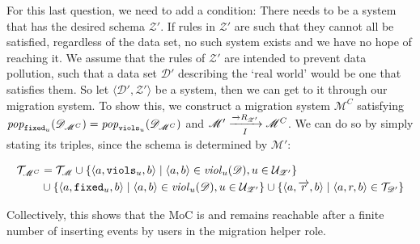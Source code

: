 \documentclass[runningheads]{llncs}
\newcommand{\id}[1]{\text{\it #1\/}}
\newcommand{\popF}[1]{\id{pop}_{#1}}
\newcommand{\pop}[2]{\popF{#1}(#2)}
\newcommand{\viol}[2]{\violC{#1}(#2)}
\newcommand{\violC}[1]{\id{viol}_{#1}}
\newcommand{\pair}[2]{\langle{#1},{#2}\rangle}
\newcommand{\triple}[3]{\langle{#1},{#2},{#3}\rangle}
\newcommand{\rels}{\mathcal{R}}   %
\newcommand{\triples}{\mathcal{T}}
\newcommand{\rules}{\mathcal{U}}
\newcommand{\dataset}{\mathscr{D}}
\newcommand{\schema}{\mathscr{Z}}
\newcommand{\migrsys}{\mathscr{M}}
\begin{document}
   For this last question, we need to add a condition:
   There needs to be a system that has the desired schema $\schema'$.
   If rules in $\schema'$ are such that they cannot all be satisfied, regardless of the data set, no such system exists and we have no hope of reaching it.
   We assume that the rules of $\schema'$ are intended to prevent data pollution, such that a data set $\dataset'$ describing the `real world' would be one that satisfies them.
   So let $\pair{\dataset'}{\schema'}$ be a system, then we can get to it through our migration system.
   To show this, we construct a migration system $\migrsys^C$ satisfying $\pop{{\tt fixed}_u}{\dataset_{\migrsys^C}}=\pop{{\tt viols}_u}{\dataset_{\migrsys^C}}$ and $\migrsys'\xrightarrow[I]{\overrightarrow\rels_{\schema'}} \migrsys^C$.
   We can do so by simply stating its triples, since the schema is determined by $\migrsys'$:
   
\begin{align}
   \begin{aligned}
   \triples_{\migrsys^C} &= \triples_\migrsys 
   \cup  \{\triple{a}{{\tt viols}_u}{b} \mid \pair{a}{b}\in \viol{u}{\dataset}, u\in \rules_{\schema'} \} \\
   &\cup \{\triple{a}{{\tt fixed}_u}{b} \mid \pair{a}{b}\in \viol{u}{\dataset}, u\in \rules_{\schema'} \}
   \cup \{\triple{a}{\overrightarrow{r}}{b} \mid \triple{a}{r}{b}\in\triples_{\dataset'}\}   
   \end{aligned}
\end{align}
   
   Collectively, this shows that the MoC is and remains reachable after a finite number of inserting events by users in the migration helper role.
   
\end{document}
